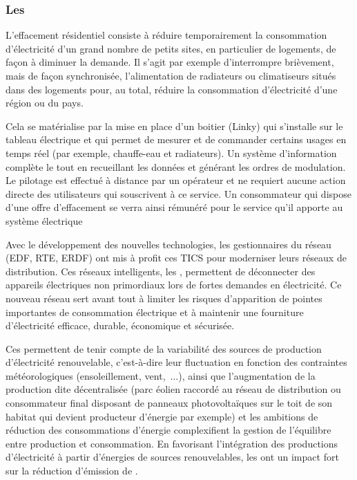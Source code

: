 			
		\subsubsection{Les \smartgrids{}}
		
			L'effacement résidentiel consiste à réduire temporairement la consommation d'électricité d'un grand nombre de petits sites, en particulier de logements, de façon à diminuer la demande. Il s'agit par exemple d'interrompre brièvement, mais de façon synchronisée, l'alimentation de radiateurs ou climatiseurs situés dans des logements pour, au total, réduire la consommation d'électricité d'une région ou du pays.
			
			Cela se matérialise par la mise en place d'un boitier (Linky) qui s'installe sur le tableau électrique et qui permet de mesurer et de commander certains usages en temps réel (par exemple, chauffe-eau et radiateurs). Un système d'information complète le tout en recueillant les données et générant les ordres de modulation. Le pilotage est effectué à distance par un opérateur et ne requiert aucune action directe des utilisateurs qui souscrivent à ce service. Un consommateur qui dispose d'une offre d'effacement se verra ainsi rémunéré pour le service qu'il apporte au système électrique
			
			Avec le développement des nouvelles technologies, les gestionnaires du réseau (EDF, RTE, ERDF) ont mis à profit ces TICS pour moderniser leurs réseaux de distribution. Ces réseaux intelligents, les \smartgrids{}, permettent de déconnecter des appareils électriques non primordiaux lors de fortes demandes en électricité. Ce nouveau réseau sert avant tout à limiter les risques d'apparition de pointes importantes de consommation électrique et à maintenir une fourniture d'électricité efficace, durable, économique et sécurisée.
			
			Ces \smartgrids{} permettent de tenir compte de la variabilité des sources de production d'électricité renouvelable, c'est-à-dire leur fluctuation en fonction des contraintes météorologiques (ensoleillement, vent,~...), ainsi que l'augmentation de la production dite décentralisée (parc éolien raccordé au réseau de distribution ou consommateur final disposant de panneaux photovoltaïques sur le toit de son habitat qui devient producteur d'énergie par exemple) et les ambitions de réduction des consommations d'énergie complexifient la gestion de l'équilibre entre production et consommation. En favorisant l'intégration des productions d'électricité à partir d'énergies de sources renouvelables, les \smartgrids{} ont un impact fort sur la réduction d'émission de .
			

